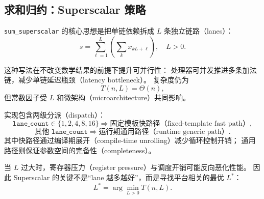 \subsection{求和归约：Superscalar 策略}

\texttt{sum\_superscalar} 的核心思想是把单链依赖拆成 \(L\) 条独立链路（lanes）：
\begin{equation}
 s = \sum_{\ell=1}^{L}\left(\sum_{k} x_{kL+\ell}\right),\quad L>0.
\end{equation}

这种写法在不改变数学结果的前提下提升可并行性：
处理器可并发推进多条加法链，减少单链延迟瓶颈（latency bottleneck）。
复杂度仍为
\begin{equation}
T(n,L)=\Theta(n),
\end{equation}
但常数因子受 \(L\) 和微架构（microarchitecture）共同影响。

实现包含两级分派（dispatch）：
\begin{equation}
\texttt{lane\_count}\in\{1,2,4,8,16\}\Rightarrow\text{固定模板快路径（fixed-template fast path）},
\end{equation}
\begin{equation}
\text{其他 }\texttt{lane\_count}\Rightarrow\text{运行期通用路径（runtime generic path）}.
\end{equation}
其中快路径通过编译期展开（compile-time unrolling）减少循环控制开销；
通用路径则保证参数空间的完备性（completeness）。

当 \(L\) 过大时，寄存器压力（register pressure）与调度开销可能反向恶化性能。
因此 Superscalar 的关键不是“lane 越多越好”，而是寻找平台相关的最优 \(L^{\ast}\)：
\begin{equation}
L^{\ast} = \arg\min_{L>0} T(n,L).
\end{equation}


